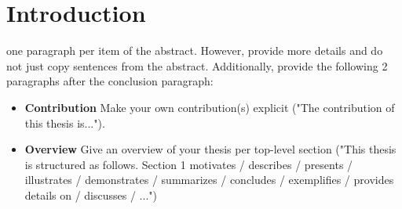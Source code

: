 
\chapter{Introduction}
one paragraph per item of the abstract. However, provide more details and do not just copy sentences from the abstract. Additionally, provide the following 2 paragraphs after the conclusion paragraph:
\begin{itemize}
	\item \textbf{Contribution} Make your own contribution(s) explicit ("The contribution of this thesis is...").
	\item  \textbf{Overview} Give an overview of your thesis per top-level section ("This thesis is structured as follows. Section 1 motivates / describes / presents / illustrates / demonstrates / summarizes / concludes / exemplifies / provides details on / discusses / ...")
\end{itemize}

